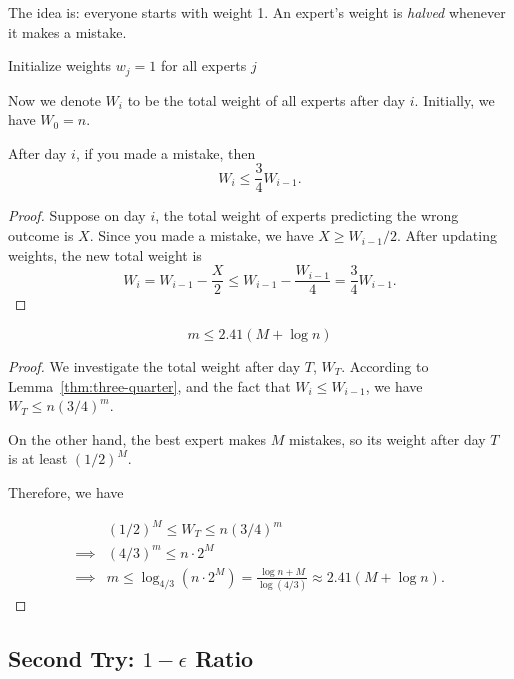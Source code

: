 The idea is: everyone starts with weight 1. An expert's weight is \textit{halved} whenever it makes a mistake.

\begin{algorithm}
    \caption{Halving MWU Algorithm}
    \label{alg:halving-weights}
    Initialize weights $w_j = 1$ for all experts $j$\;
\end{algorithm}

Now we denote $W_i$ to be the total weight of all experts after day $i$. Initially, we have $W_0 = n$.

\begin{lemma}\label{thm:three-quarter}
  After day $i$, if you made a mistake, then
  \[ W_i \leq \frac{3}{4} W_{i-1}. \]
\end{lemma}
\begin{proof}
  Suppose on day $i$, the total weight of experts predicting the wrong outcome is $X$. Since you made a mistake, we have $X \geq W_{i-1}/2$. After updating weights, the new total weight is
  \[ W_i = W_{i-1} - \frac{X}{2} \leq W_{i-1} - \frac{W_{i-1}}{4} = \frac{3}{4} W_{i-1}. \]
\end{proof}

\begin{theorem}
  \[ m \leq 2.41 (M + \log n) \]
\end{theorem}
\begin{proof}
  We investigate the total weight after day $T$, $W_T$. According to Lemma~\ref{thm:three-quarter}, and the fact that $W_i \leq W_{i-1}$, we have $W_T \leq n (3/4)^m$.

  On the other hand, the best expert makes $M$ mistakes, so its weight after day $T$ is at least $(1/2)^M$. 

  Therefore, we have

  \begin{align*}
    &(1/2)^M \leq W_T \leq n (3/4)^m \\
    \implies &(4/3)^m \leq n \cdot 2^M \\
    \implies &m \leq \log_{4/3} (n \cdot 2^M) = \frac{\log n + M}{\log(4/3)} \approx 2.41 (M + \log n).
  \end{align*}
\end{proof}

\subsection{Second Try: $1 - \epsilon$ Ratio}

